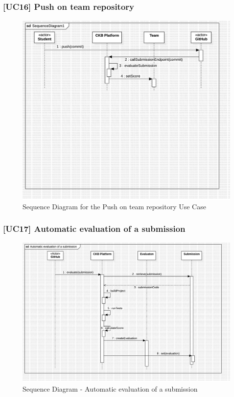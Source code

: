 \subsubsection*{[UC16] Push on team repository}
\begin{figure}[H]
    \centering
    \includegraphics[width=\textwidth]{Diagrams/UC16SequenceDiagram.jpg}
    \caption{Sequence Diagram for the Push on team repository Use Case}
    \label{fig:sequence-diagram-push-repository}
\end{figure}

\subsubsection*{[UC17] Automatic evaluation of a submission}
\begin{figure}[H]
    \centering
    \includegraphics[width=\textwidth]{Diagrams/AutomaticEvaluation.jpg}
    \caption{Sequence Diagram - Automatic evaluation of a submission}
    \label{fig:sequence-diagram-automatic-evaluation}
\end{figure}

